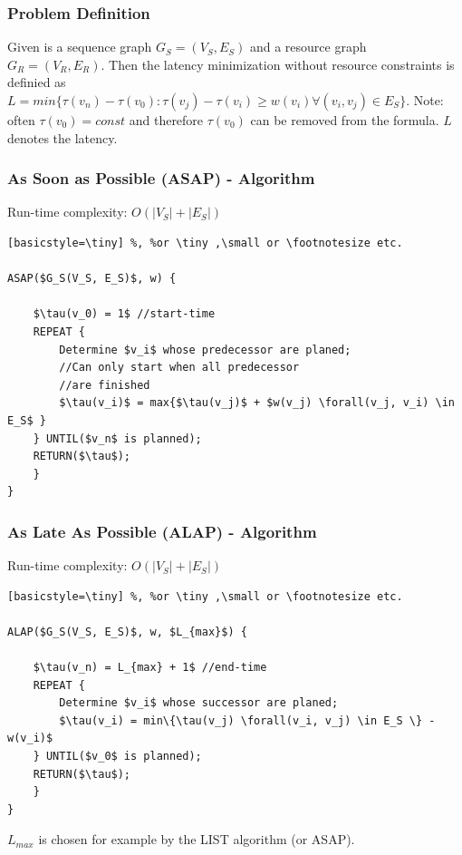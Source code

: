 \subsubsection{Problem Definition}
Given is a sequence graph $G_S = (V_S, E_S)$ and a resource graph $G_R = (V_R, E_R)$. Then the latency minimization without resource constraints is definied as ${ L = min\{ \tau(v_n) - \tau(v_0): \tau(v_j) - \tau(v_i) \geq w(v_i) \forall (v_i, v_j) \in E_S    \} }$. Note: often $\tau(v_0) = const$ and therefore $\tau(v_0)$ can be removed from the formula. $L$ denotes the latency.

\subsubsection{As Soon as Possible (ASAP) - Algorithm}

Run-time complexity: $O(|V_S|  + |E_S|)$
\begin{lstlisting}[mathescape][basicstyle=\tiny] %, %or \tiny ,\small or \footnotesize etc.

ASAP($G_S(V_S, E_S)$, w) {

	$\tau(v_0) = 1$ //start-time
	REPEAT {
		Determine $v_i$ whose predecessor are planed;
		//Can only start when all predecessor 
		//are finished
		$\tau(v_i)$ = max{$\tau(v_j)$ + $w(v_j) \forall(v_j, v_i) \in E_S$ }
	} UNTIL($v_n$ is planned);
	RETURN($\tau$);
	}
}

\end{lstlisting}


\subsubsection{As Late As Possible (ALAP) - Algorithm}
Run-time complexity: $O( |V_S| + |E_S|)$

\begin{lstlisting}[mathescape][basicstyle=\tiny] %, %or \tiny ,\small or \footnotesize etc.

ALAP($G_S(V_S, E_S)$, w, $L_{max}$) {

	$\tau(v_n) = L_{max} + 1$ //end-time
	REPEAT {
		Determine $v_i$ whose successor are planed;
		$\tau(v_i) = min\{\tau(v_j) \forall(v_i, v_j) \in E_S \} - w(v_i)$
	} UNTIL($v_0$ is planned);
	RETURN($\tau$);
	}
}

\end{lstlisting}

\begin{tnote}
$L_{max}$ is chosen for example by the LIST algorithm (or ASAP).
\end{tnote}



